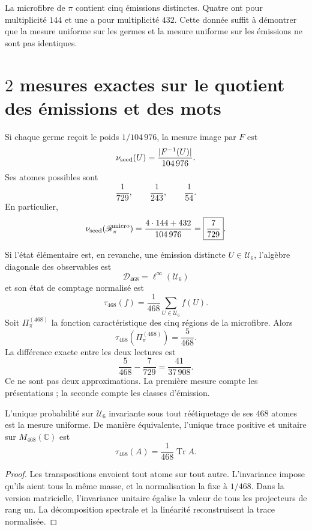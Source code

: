 La microfibre de \(\pi\) contient cinq émissions distinctes. Quatre ont
pour multiplicité \(144\) et une a pour multiplicité \(432\). Cette donnée suffit
à démontrer que la mesure uniforme sur les germes et la mesure uniforme
sur les émissions ne sont pas identiques.

\section{\(2\) mesures exactes sur le quotient des émissions et des mots}

Si chaque germe reçoit le poids \(1/104\,976\), la mesure image par \(F\) est
\[
 \nu_{\rm seed}(U)
 =\frac{|F^{-1}(U)|}{104\,976}.
\]
Ses atomes possibles sont
\[
 \frac1{729},\qquad\frac1{243},\qquad\frac1{54}.
\]
En particulier,
\[
 \nu_{\rm seed}(\mathscr R_\pi^{\rm micro})
 =\frac{4\cdot144+432}{104\,976}
 =\boxed{\frac7{729}}.
\]

Si l’état élémentaire est, en revanche, une émission distincte
\(U\in\mathcal U_6\), l’algèbre diagonale des observables est
\[
 \mathcal D_{468}=\ell^\infty(\mathcal U_6)
\]
et son état de comptage normalisé est
\[
 \tau_{468}(f)
 =\frac1{468}\sum_{U\in\mathcal U_6}f(U).
\]
Soit \(\Pi_\pi^{(468)}\) la fonction caractéristique des cinq régions de la
microfibre. Alors
\[
 \boxed{\tau_{468}(\Pi_\pi^{(468)})=\frac5{468}.}
\]
La différence exacte entre les deux lectures est
\[
 \frac5{468}-\frac7{729}
 =\frac{41}{37\,908}.
\]
Ce ne sont pas deux approximations. La première mesure compte les présentations ; la
seconde compte les classes d’émission.

\begin{theorem}
\label{p3-20260826:thm:unicidad-medida-468}
L’unique probabilité sur \(\mathcal U_6\) invariante sous tout
réétiquetage de ses \(468\) atomes est la mesure uniforme.
De manière équivalente, l’unique trace positive et unitaire sur
\(M_{468}(\mathbb C)\) est
\[
 \tau_{468}(A)=\frac1{468}\operatorname{Tr}A.
\]
\end{theorem}

\begin{proof}
Les transpositions envoient tout atome sur tout autre. L’invariance
impose qu’ils aient tous la même masse, et la normalisation la fixe à
\(1/468\). Dans la version matricielle, l’invariance unitaire égalise la valeur
de tous les projecteurs de rang un. La décomposition spectrale et la
linéarité reconstruisent la trace normalisée.
\end{proof}

